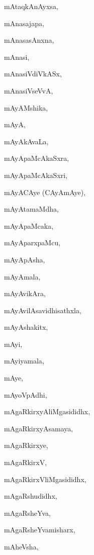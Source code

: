 \begin{multicols}{2}
{mAtaqkAnAyxsa}, \pageref{mAtaqkAnAyxsa}

{mAnasajapa}, \pageref{mAnasajapa}

{mAnasasAnxna}, \pageref{mAnasasAnxna}

{mAnasi}, \pageref{mAnasi}

{mAnasiVdiVkASx}, \pageref{mAnasiVdiVkASx}

{mAnasiVseVvA}, \pageref{mAnasiVseVvA}

{mAyAMshika}, \pageref{mAyAMshika}

{mAyA}, \pageref{mAyA}

{mAyAkAvaLa}, \pageref{mAyAkAvaLa}

{mAyApaMcAkaSxra}, \pageref{mAyApaMcAkaSxra}

{mAyApaMcAkaSxri}, \pageref{mAyApaMcAkaSxri}

{mAyACAye (CAyAmAye)}, \pageref{mAyACAyeCAyAmAye}

{mAyAtamaMdha}, \pageref{mAyAtamaMdha}

{mAyApaMcaka}, \pageref{mAyApaMcaka}

{mAyAparxpaMcu}, \pageref{mAyAparxpaMcu}

{mAyApAsha}, \pageref{mAyApAsha}

{mAyAmala}, \pageref{mAyAmala}

{mAyAvikAra}, \pageref{mAyAvikAra}

{mAyAvilAsavidhisathxla}, \pageref{mAyAvilAsavidhisathxla}

{mAyAshakitx}, \pageref{mAyAshakitx}

{mAyi}, \pageref{mAyi}

{mAyiyamala}, \pageref{mAyiyamala}

{mAye}, \pageref{mAye}

{mAyoVpAdhi}, \pageref{mAyoVpAdhi}

{mAgaRkirxyAliMgasididhx}, \pageref{mAgaRkirxyAliMgasididhx}

{mAgaRkirxyAsamaya}, \pageref{mAgaRkirxyAsamaya}

{mAgaRkirxye}, \pageref{mAgaRkirxye}

{mAgaRkirxV}, \pageref{mAgaRkirxV}

{mAgaRkirxVliMgasididhx}, \pageref{mAgaRkirxVliMgasididhx}

{mAgaRshudidhx}, \pageref{mAgaRshudidhx}

{mAgaRsheYva}, \pageref{mAgaRsheYva}

{mAgaRsheYvamisharx}, \pageref{mAgaRsheYvamisharx}

{mAheVsha}, \pageref{mAheVsha}


\end{multicols}
